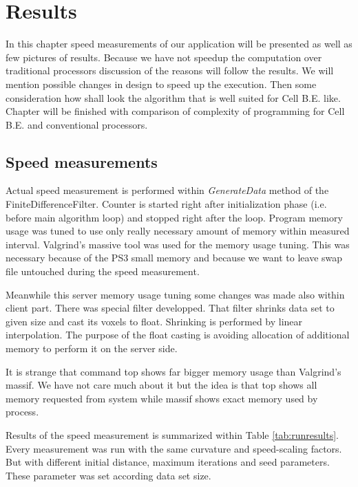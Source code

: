 \chapter{Results}

In this chapter speed measurements of our application will be presented as well as few pictures of results.
Because we have not speedup the computation over traditional processors discussion of the reasons will follow the results.
We will mention possible changes in design to speed up the execution.
Then some consideration how shall look the algorithm that is well suited for Cell B.E. like.
Chapter will be finished with comparison of complexity of programming for Cell B.E. and conventional processors.

\section{Speed measurements}

\par
Actual speed measurement is performed within \emph{GenerateData} method of the FiniteDifferenceFilter.
Counter is started right after initialization phase (i.e. before main algorithm loop) and stopped right after the loop.
Program memory usage was tuned to use only really necessary amount of memory within measured interval.
Valgrind's massive tool was used for the memory usage tuning.
This was necessary because of the PS3 small memory and because we want to leave swap file untouched during the speed measurement.

\par
Meanwhile this server memory usage tuning some changes was made also within client part.
There was special filter developped.
That filter shrinks data set to given size and cast its voxels to float.
Shrinking is performed by linear interpolation.
The purpose of the float casting is avoiding allocation of additional memory to perform it on the server side.

\par
It is strange that command top shows far bigger memory usage than Valgrind's massif.
We have not care much about it but the idea is that top shows all memory requested from system while massif shows exact memory used by process.

\par
Results of the speed measurement is summarized within Table \ref{tab:runresults}.
Every measurement was run with the same curvature and speed-scaling factors.
But with different initial distance, maximum iterations and seed parameters.
These parameter was set according data set size.

